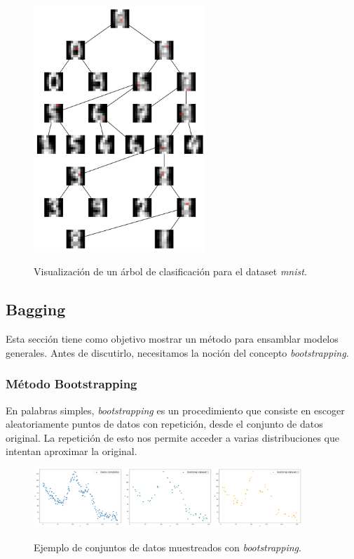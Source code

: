 \begin{figure}[H]
    \centering
    \includegraphics[width=0.58\textwidth]{img/capN_interpretacion_arbol.png}\\
    \caption{Visualización de un árbol de clasificación para el dataset \textit{mnist}.}
    \label{fig:arbol_interpretabilidad}
\end{figure}


\subsection{Bagging}
\label{sec:bagging}

Esta sección tiene como objetivo mostrar un método para ensamblar modelos generales. Antes de discutirlo, necesitamos la noción del concepto \textit{bootstrapping}.

\subsubsection{Método Bootstrapping}

En palabras simples, \textit{bootstrapping} es un procedimiento que consiste en escoger aleatoriamente puntos de datos con repetición, desde el conjunto de datos original. La repetición de esto nos permite acceder a varias distribuciones que intentan aproximar la original.

\begin{figure}[h]
	\centering
	\includegraphics[width=0.9\textwidth]{img/capN_bootstrapping.png}\\
	\caption{Ejemplo de conjuntos de datos muestreados con \textit{bootstrapping}.}
\end{figure}

